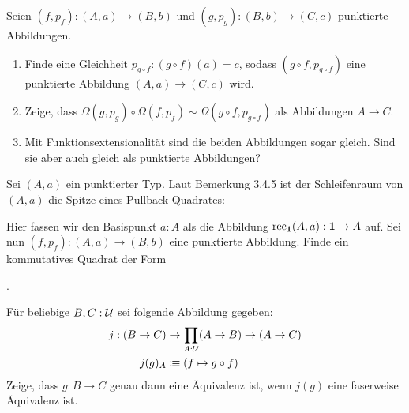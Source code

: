 \documentclass{uebung}
\begin{document}

\begin{exercise}
  Seien $(f,p_f):(A,a)\to (B,b)$ und $(g,p_g):(B,b)\to (C,c)$ punktierte Abbildungen.
  \begin{enumerate}
    \item Finde eine Gleichheit $p_{g\circ f}:(g\circ f)(a)=c$, sodass $(g\circ f,p_{g\circ f})$ eine punktierte Abbildung $(A,a)\to (C,c)$ wird.
    \item Zeige, dass $\Omega(g,p_g)\circ\Omega(f,p_f) \sim \Omega(g\circ f,p_{g\circ f})$ als Abbildungen $A\to C$.
    \item Mit Funktionsextensionalität sind die beiden Abbildungen sogar gleich.
      Sind sie aber auch gleich als punktierte Abbildungen?
  \end{enumerate}
\end{exercise}

\begin{exercise}
  Sei $(A,a)$ ein punktierter Typ.
  Laut Bemerkung 3.4.5 ist der Schleifenraum von $(A,a)$ die Spitze eines Pullback-Quadrates:
  \begin{center}
  \end{center}
  Hier fassen wir den Basispunkt $a:A$ als die Abbildung $\mathrm{rec}_{\mathbf{1}}(A,a):\mathbf{1} \to A$ auf.
  Sei nun $(f,p_f):(A,a)\to (B,b)$ eine punktierte Abbildung.
  Finde ein kommutatives Quadrat der Form
  \begin{center}
    .
  \end{center}
\end{exercise}

\begin{exercise}
  Für beliebige $B,C:\mathcal{U}$ sei folgende Abbildung gegeben:
  \begin{align*}
    j:(B\to C) &\to \prod_{A:\mathcal{U}} (A \to B) \to (A \to C)\\
    j(g)_A &\vcentcolon\mspace{-1.2mu}\equiv (f \mapsto g\circ f)
  \end{align*}
  Zeige, dass $g:B \to C$ genau dann eine Äquivalenz ist, wenn $j(g)$ eine faserweise Äquivalenz ist.
\end{exercise}
\end{document}
